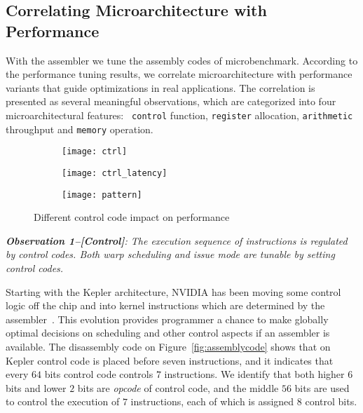 \subsection{Correlating Microarchitecture with Performance}
\label{sec:benchmark}


With the assembler we tune the assembly codes of microbenchmark. According to the performance tuning results, we 
correlate microarchitecture with performance variants that guide optimizations in real applications. The correlation is 
presented as several meaningful observations, which are categorized into four microarchitectural features:  {\tt 
control} function, {\tt register} allocation, {\tt arithmetic} throughput and {\tt memory} operation.
    \begin{figure*}
        \begin{subfigure}[htbp]{0.3\textwidth}
            \texttt{[image: ctrl]}
            \label{fig:control_throughput}
        \end{subfigure}
        \begin{subfigure}[htbp]{0.3\textwidth}
            \texttt{[image: ctrl\_latency]}
            \label{fig:control_latency}
        \end{subfigure}
        \begin{subfigure}[htbp]{0.3\textwidth}
            \texttt{[image: pattern]}
            \label{fig:control_pattern}
        \end{subfigure}
        \caption{Different control code impact on performance}\label{fig:control_code}
    \end{figure*}


{\em {\bf Observation 1--[Control]}: The execution sequence of instructions is regulated by control codes. Both warp 
scheduling and issue mode are tunable by setting control codes.}

Starting with the Kepler architecture, NVIDIA has been moving some control logic off the chip and into kernel 
instructions which are determined by the assembler~\cite{lai,maxas}. This evolution provides programmer a chance to 
make globally optimal decisions on scheduling and other control aspects if an assembler is available. The disassembly 
code on Figure~\ref{fig:assemblycode} shows that on Kepler control code is placed before seven instructions, and it 
indicates that every $64$ bits control code controls $7$ instructions. We identify that both higher $6$ bits and lower 
$2$ bits are {\em opcode} of control code, and the middle $56$ bits are used to control the execution of $7$ 
instructions, each of which is assigned $8$ control bits.

